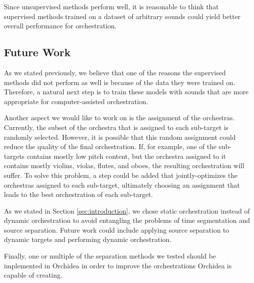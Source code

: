 \documentclass{article}
\begin{document}
  Since unsupervised methods perform well, it is reasonable to think that supervised methods trained on a dataset of arbitrary sounds could yield better overall performance for orchestration.
  
    \subsection{Future Work}\label{sec:futurework}  
    As we stated previously, we believe that one of the reasons the supervised methods did not perform as well is because of the data they were trained on. Therefore, a natural next step is to train these models with sounds that are more appropriate for computer-assisted orchestration.
    
    Another aspect we would like to work on is the assignment of the orchestras. Currently, the subset of the orchestra that is assigned to each sub-target is randomly selected. However, it is possible that this random assignment could reduce the quality of the final orchestration. If, for example, one of the sub-targets contains mostly low pitch content, but the orchestra assigned to it contains mostly violins, violas, flutes, and oboes, the resulting orchestration will suffer. To solve this problem, a step could be added that jointly-optimizes the orchestras assigned to each sub-target, ultimately choosing an assignment that leads to the best orchestration of each sub-target.
    
    As we stated in Section \ref{sec:introduction}, we chose static orchestration instead of dynamic orchestration to avoid entangling the problems of time segmentation and source separation. Future work could include applying source separation to dynamic targets and performing dynamic orchestration.
    
    Finally, one or multiple of the separation methods we tested should be implemented in Orchidea in order to improve the orchestrations Orchidea is capable of creating. 



\end{document}
